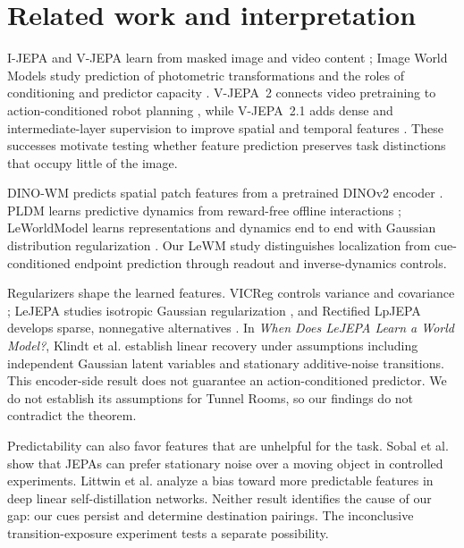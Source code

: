 \section{Related work and interpretation}
\label{app:related}

I-JEPA and V-JEPA learn from masked image and video content
\citep{assran2023ijepa,bardes2024vjepa}; Image World Models study prediction
of photometric transformations and the roles of conditioning and predictor
capacity \citep{garrido2024iwm}. V-JEPA~2 connects video pretraining to
action-conditioned robot planning \citep{assran2025vjepa2}, while
V-JEPA~2.1 adds dense and intermediate-layer supervision to improve spatial
and temporal features \citep{murlabadia2026vjepa21}. These successes motivate testing whether feature prediction preserves
task distinctions that occupy little of the image.

DINO-WM predicts spatial patch features from
a pretrained DINOv2 encoder \citep{zhou2025dinowm,oquab2023dinov2}.
PLDM learns predictive dynamics from reward-free offline interactions
\citep{sobal2025latentplanning}; LeWorldModel learns representations and
dynamics end to end with Gaussian distribution regularization
\citep{maes2026leworldmodel}. Our LeWM study distinguishes localization from cue-conditioned endpoint
prediction through readout and inverse-dynamics controls.

Regularizers shape the learned features. VICReg controls variance and covariance
\citep{bardes2022vicreg}; LeJEPA studies isotropic Gaussian regularization
\citep{balestriero2025lejepa}, and Rectified LpJEPA develops sparse,
nonnegative alternatives \citep{kuang2026rectified}.
In \emph{When Does LeJEPA Learn a World Model?}, Klindt et al.
\citep{klindt2026when} establish linear recovery under assumptions including
independent Gaussian latent variables and stationary additive-noise
transitions. This encoder-side result does not guarantee an action-conditioned predictor.
We do not establish its assumptions for Tunnel Rooms, so our findings do
not contradict the theorem.

Predictability can also favor features that are unhelpful for the task.
Sobal et al. \citep{sobal2022slow} show that JEPAs can prefer stationary
noise over a moving object in controlled experiments. Littwin et al.
\citep{littwin2024jepa} analyze a bias toward more predictable features in
deep linear self-distillation networks. Neither result identifies the cause of our gap: our cues persist and
determine destination pairings. The inconclusive transition-exposure
experiment tests a separate possibility.

